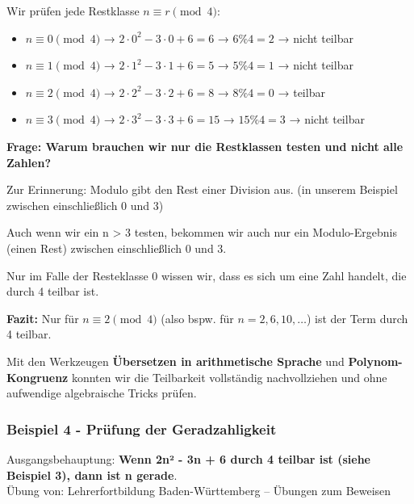 \documentclass{article}
\begin{document}
Wir prüfen jede Restklasse $n \equiv r \pmod{4}$:


        \begin{itemize}


      
        \item $n \equiv 0 \pmod{4}$ → $2\cdot0^2 - 3\cdot0 + 6 = 6$ → $6 \% 4 = 2$ → nicht teilbar

        \item $n \equiv 1 \pmod{4}$ → $2\cdot1^2 - 3\cdot1 + 6 = 5$ → $5 \% 4 = 1$ → nicht teilbar

        \item $n \equiv 2 \pmod{4}$ → $2\cdot2^2 - 3\cdot2 + 6 = 8$ → $8 \% 4 = 0$ → teilbar

        \item $n \equiv 3 \pmod{4}$ → $2\cdot3^2 - 3\cdot3 + 6 = 15$ → $15 \% 4 = 3$ → nicht teilbar

      \end{itemize}

      \textbf{Frage: Warum brauchen wir nur die Restklassen testen und nicht alle Zahlen?}
      
Zur Erinnerung: Modulo gibt den Rest einer Division aus. (in unserem Beispiel zwischen einschließlich 0 und 3)

      
Auch wenn wir ein n > 3 testen, bekommen wir auch nur ein Modulo-Ergebnis (einen Rest) zwischen einschließlich 0 und 3.

      
Nur im Falle der Resteklasse 0 wissen wir, dass es sich um eine Zahl handelt, die durch 4 teilbar ist.


      

      	\textbf{Fazit:} Nur für $n \equiv 2 \pmod{4}$ (also bspw. für $n = 2, 6, 10, \dots$) ist der Term durch 4 teilbar.
      


      

        Mit den Werkzeugen \textbf{Übersetzen in arithmetische Sprache} und \textbf{Polynom-Kongruenz} konnten wir die Teilbarkeit vollständig nachvollziehen und ohne aufwendige algebraische Tricks prüfen.
      


      \subsubsection{Beispiel 4 - Prüfung der Geradzahligkeit}

      

        Ausgangsbehauptung: \textbf{Wenn 2n² - 3n + 6 durch 4 teilbar ist (siehe Beispiel 3), dann ist n gerade}.\\
        Übung von: Lehrerfortbildung Baden-Württemberg – Übungen zum Beweisen
      
\end{document}
